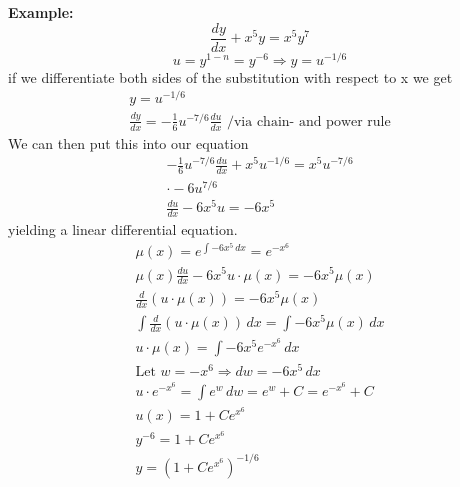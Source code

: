 \documentclass[12pt]{article}
\begin{document}
\noindent 
\textbf{Example:}
\[ 
    \frac{dy}{dx} + x^5y = x^5y^7
\]
\[ 
    u=y^{1-n} = y^{-6} \Rightarrow y = u^{-1/6}
\]
if we differentiate both sides of the substitution with respect to x 
we get 
\begin{gather*}
    y = u^{-1/6} \\ 
    \frac{dy}{dx} = -\frac{1}{6} u^{-7/6} 
    \frac{du}{dx} \text{ /via chain- and power rule} 
\end{gather*}
We can then put this into our equation 
\begin{gather*}
    -\frac{1}{6}u^{-7/6}\frac{du}{dx} + x^5u^{-1/6} = 
    x^5u^{-7/6} \\ 
    \cdot -6u^{7/6} \\ 
    \frac{du}{dx}-6x^5u = -6x^5
\end{gather*}
yielding a linear differential equation.
\begin{gather*}
    \mu(x) = e^{\int -6x^5\,dx }= e^{-x^6} \\ 
    \mu(x)\frac{du}{dx} - 6x^5u \cdot \mu(x) = -6x^5 \mu(x) \\
    \frac{d}{dx}(u\cdot \mu(x)) = -6x^5 \mu(x) \\
    \int \frac{d}{dx}(u \cdot \mu(x))\,dx = \int -6x^5 \mu(x)\,dx \\
    u \cdot \mu(x) = \int -6x^5 e^{-x^6} \, dx \\
    \text{Let } w = -x^6 \Rightarrow dw = -6x^5\,dx \\
    u \cdot e^{-x^6} = \int e^w \, dw = e^w + C = e^{-x^6} + C \\
    u(x) = 1 + C e^{x^6} \\ 
    y^{-6} = 1 + Ce^{x^6} \\ 
    y = \left( 1 + Ce^{x^6} \right)^{-1/6}
\end{gather*}
\end{document}
